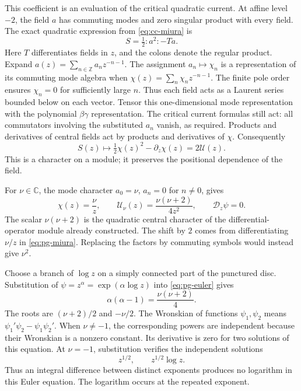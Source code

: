 This coefficient is an evaluation of the critical quadratic current.
At affine level $-2$, the field $a$ has commuting modes and zero singular product with every field.
The exact quadratic expression from \eqref{eq:cc-miura} is
\[
 S=\tfrac12:a^2:-Ta.
\]
Here $T$ differentiates fields in $z$, and the colons denote the regular product.
Expand $a(z)=\sum_{n\in\mathbb Z}a_nz^{-n-1}$.
The assignment $a_n\mapsto\chi_n$ is a representation of its commuting mode algebra when
$\chi(z)=\sum_n\chi_nz^{-n-1}$.
The finite pole order ensures $\chi_n=0$ for sufficiently large $n$.
Thus each field acts as a Laurent series bounded below on each vector.
Tensor this one-dimensional mode representation with the polynomial $\beta\gamma$ representation.
The critical current formulas still act: all commutators involving the substituted $a_n$ vanish, as required.
Products and derivatives of central fields act by products and derivatives of $\chi$.
Consequently
\[
 S(z)\longmapsto\tfrac12\chi(z)^2-\partial_z\chi(z)=2\mathcal U(z).
\]
This is a character on a module; it preserves the positional dependence of the field.

For $\nu\in\mathbb C$, the mode character $a_0=\nu$, $a_n=0$ for $n\ne0$, gives
\begin{equation}\label{eq:pg-euler}
 \chi(z)=\frac\nu z,
 \qquad \mathcal U_\nu(z)=\frac{\nu(\nu+2)}{4z^2},
 \qquad \mathscr D_z\psi=0.
\end{equation}
The scalar $\nu(\nu+2)$ is the quadratic central character of the differential-operator module already constructed.
The shift by $2$ comes from differentiating $\nu/z$ in \eqref{eq:pg-miura}.
Replacing the factors by commuting symbols would instead give $\nu^2$.

Choose a branch of $\log z$ on a simply connected part of the punctured disc.
Substitution of $\psi=z^\alpha=\exp(\alpha\log z)$ into \eqref{eq:pg-euler} gives
\[
 \alpha(\alpha-1)=\frac{\nu(\nu+2)}4.
\]
The roots are $(\nu+2)/2$ and $-\nu/2$.
The Wronskian of functions $\psi_1,\psi_2$ means $\psi_1'\psi_2-\psi_1\psi_2'$.
When $\nu\ne-1$, the corresponding powers are independent because their Wronskian is a nonzero constant.
Its derivative is zero for two solutions of this equation.
At $\nu=-1$, substitution verifies the independent solutions
\[
 z^{1/2},\qquad z^{1/2}\log z.
\]
Thus an integral difference between distinct exponents produces no logarithm in this Euler equation.
The logarithm occurs at the repeated exponent.

